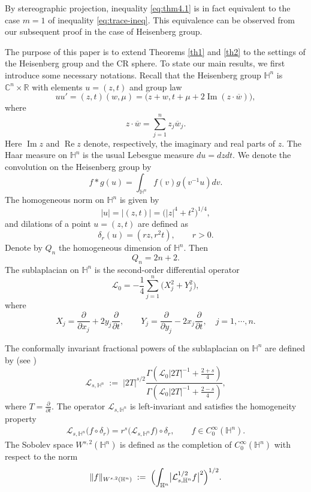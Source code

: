 \documentclass[12pt,reqno]{amsart}%
\theoremstyle{plain}
\numberwithin{equation}{section}
\begin{document}
By stereographic projection, inequality \eqref{eq:thm4.1} is in fact equivalent to the case \( m = 1 \) of inequality \eqref{eq:trace-ineq}. This equivalence can be observed from our subsequent proof in the case of  Heisenberg group.


The purpose of this paper is to extend Theorems \ref{th1} and \ref{th2} to the settings of the Heisenberg group and the CR sphere.
To state our main results, we first introduce some necessary notations.
Recall that the Heisenberg group \(\mathbb{H}^n\) is \(\mathbb{C}^n \times \mathbb{R}\) with elements \(u = (z,t)\) and group law
\[
uu' = (z,t)(w,\mu) = \bigl(z + w, t + \mu + 2\operatorname{Im}(z \cdot \overline{w})\bigr),
\]
where
\[
z \cdot \overline{w} = \sum_{j=1}^{n} z_j \overline{w}_j.
\]
Here \(\operatorname{Im} z\) and \(\operatorname{Re} z\) denote, respectively, the imaginary and real parts of \(z\).
The Haar measure on \(\mathbb{H}^n\) is the usual Lebesgue measure \(du = dzdt\).
We denote the convolution on the Heisenberg group by
\[
f * g(u) = \int_{\mathbb{H}^n} f(v)g(v^{-1}u) dv.
\]
The homogeneous norm on \(\mathbb{H}^n\) is given by
\[
|u| = |(z,t)| = \bigl(|z|^4 + t^2\bigr)^{1/4},
\]
and dilations of a point \(u = (z,t)\) are defined as
\[
\delta_r(u) = (r z, r^2 t),\qquad r > 0.
\]
 Denote by $Q_n$ the homogeneous dimension of \(\mathbb{H}^n\).  Then
$$Q_n = 2n+2.$$
The sublaplacian on \(\mathbb{H}^n\) is the second-order differential operator
\[
\mathcal{L}_0 = -\frac{1}{4} \sum_{j=1}^n \bigl(X_j^2 + Y_j^2\bigr),
\]
where
\[
X_j = \frac{\partial}{\partial x_j} + 2y_j \frac{\partial}{\partial t},\qquad
Y_j = \frac{\partial}{\partial y_j} - 2x_j \frac{\partial}{\partial t},\quad j=1,\cdots,n.
\]


The conformally invariant fractional powers of the sublaplacian on \(\mathbb{H}^{n}\) are defined by (see \cite{Co,ron1})
\[
\mathcal{L}_{s,\mathbb{H}^{n}} \;:=\; |2T|^{s/2}
\frac{\Gamma\left(\mathcal{L}_0 |2T|^{-1} + \frac{2+s}{4}\right)}
{\Gamma\left(\mathcal{L}_0 |2T|^{-1} + \frac{2-s}{4}\right)},
\]
where \(T = \frac{\partial}{\partial t}\).
The operator \(\mathcal{L}_{s,\mathbb{H}^{n}}\) is left-invariant and satisfies the homogeneity property
\begin{align}\label{1.4}
\mathcal{L}_{s,\mathbb{H}^{n}}\bigl(f \circ \delta_r\bigr)
= r^{s}\bigl(\mathcal{L}_{s,\mathbb{H}^{n}} f\bigr)\circ \delta_r,\qquad
f \in C_{0}^{\infty}(\mathbb{H}^{n}).
\end{align}
The Sobolev space \(W^{s,2}(\mathbb{H}^{n})\) is defined as the completion of \(C_{0}^{\infty}(\mathbb{H}^{n})\) with respect to the norm
\[
\|f\|_{W^{s,2}(\mathbb{H}^{n})} \;:=\;
\Bigl(\int_{\mathbb{H}^{n}} \bigl|\mathcal{L}_{s,\mathbb{H}^{n}}^{1/2}f\bigr|^{2}\Bigr)^{1/2}.
\]
\end{document}
